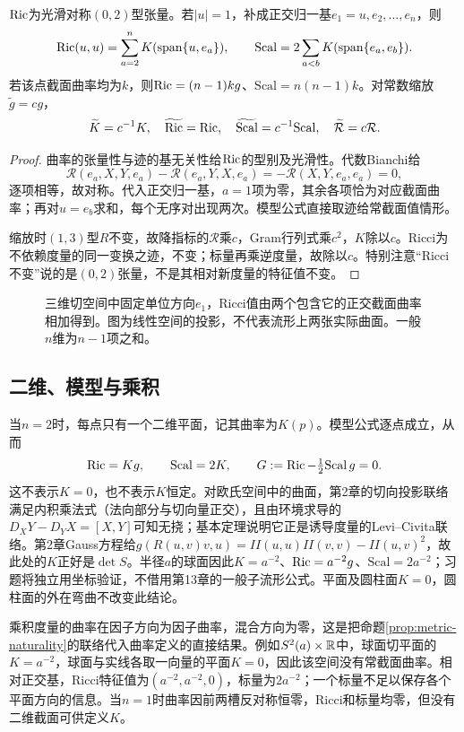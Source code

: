 \begin{proposition}[缩并、方向平均与缩放]\label{prop:ricci-traces}
$\operatorname{Ric}$为光滑对称$(0,2)$型张量。若$|u|=1$，补成正交归一基$e_1=u,e_2,\ldots,e_n$，则
\[
 \Ric(u,u)=\sum_{a=2}^n K(\operatorname{span}\{u,e_a\}),\qquad
 \mathrm{Scal}=2\sum_{a<b}K(\operatorname{span}\{e_a,e_b\}).
\]
若该点截面曲率均为$k$，则$\operatorname{Ric}=(n-1)kg$、$\mathrm{Scal}=n(n-1)k$。对常数缩放$\widetilde g=cg$，
\[
 \widetilde K=c^{-1}K,\quad \widetilde{\operatorname{Ric}}=\operatorname{Ric},\quad
 \widetilde{\mathrm{Scal}}=c^{-1}\mathrm{Scal},\quad \widetilde{\mathcal R}=c\mathcal R.
\]
\end{proposition}
\begin{proof}
曲率的张量性与迹的基无关性给$\operatorname{Ric}$的型别及光滑性。代数Bianchi给
\[
 \mathcal R(e_a,X,Y,e_a)-\mathcal R(e_a,Y,X,e_a)
 =-\mathcal R(X,Y,e_a,e_a)=0,
\]
逐项相等，故对称。代入正交归一基，$a=1$项为零，其余各项恰为对应截面曲率；再对$u=e_b$求和，每个无序对出现两次。模型公式直接取迹给常截面值情形。

缩放时$(1,3)$型$R$不变，故降指标的$\mathcal R$乘$c$，Gram行列式乘$c^2$，$K$除以$c$。Ricci为不依赖度量的同一变换之迹，不变；标量再乘逆度量，故除以$c$。特别注意“Ricci不变”说的是$(0,2)$张量，不是其相对新度量的特征值不变。
\end{proof}

\begin{figure}[htbp]
\centering
\caption{三维切空间中固定单位方向$e_1$，Ricci值由两个包含它的正交截面曲率相加得到。图为线性空间的投影，不代表流形上两张实际曲面。一般$n$维为$n-1$项之和。}
\label{fig:sectional-trace}
\end{figure}

\subsection*{二维、模型与乘积}
当$n=2$时，每点只有一个二维平面，记其曲率为$K(p)$。模型公式逐点成立，从而
\[
 \operatorname{Ric}=Kg,\qquad \mathrm{Scal}=2K,\qquad
 G:=\operatorname{Ric}-\tfrac12\mathrm{Scal}\,g=0.
\]
这不表示$K=0$，也不表示$K$恒定。对欧氏空间中的曲面，第2章的切向投影联络满足内积乘法式（法向部分与切向量正交），且由环境求导的$D_XY-D_YX=[X,Y]$可知无挠；基本定理说明它正是诱导度量的Levi--Civita联络。第2章Gauss方程给$g(R(u,v)v,u)=II(u,u)II(v,v)-II(u,v)^2$，故此处的$K$正好是$\det S$。半径$a$的球面因此$K=a^{-2}$、$\operatorname{Ric}=a^{-2}g$、$\mathrm{Scal}=2a^{-2}$；习题将独立用坐标验证，不借用第13章的一般子流形公式。平面及圆柱面$K=0$，圆柱面的外在弯曲不改变此结论。

乘积度量的曲率在因子方向为因子曲率，混合方向为零，这是把命题\ref{prop:metric-naturality}的联络代入曲率定义的直接结果。例如$S^2(a)\times\mathbb{R}$中，球面切平面的$K=a^{-2}$，球面与实线各取一向量的平面$K=0$，因此该空间没有常截面曲率。相对正交基，Ricci特征值为$(a^{-2},a^{-2},0)$，标量为$2a^{-2}$；一个标量不足以保存各个平面方向的信息。当$n=1$时曲率因前两槽反对称恒零，Ricci和标量均零，但没有二维截面可供定义$K$。

